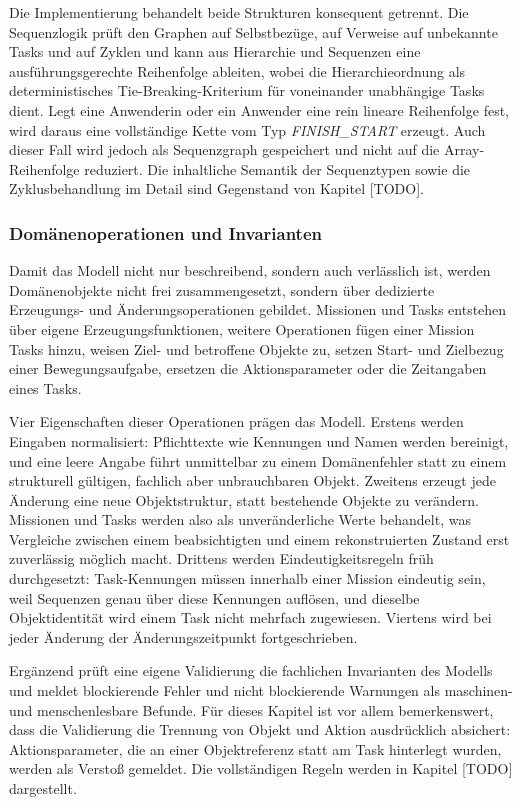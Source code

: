 Die Implementierung behandelt beide Strukturen konsequent getrennt. Die Sequenzlogik prüft den
Graphen auf Selbstbezüge, auf Verweise auf unbekannte Tasks und auf Zyklen und kann aus Hierarchie
und Sequenzen eine ausführungsgerechte Reihenfolge ableiten, wobei die Hierarchieordnung als
deterministisches Tie-Breaking-Kriterium für voneinander unabhängige Tasks dient. Legt eine
Anwenderin oder ein Anwender eine rein lineare Reihenfolge fest, wird daraus eine vollständige Kette
vom Typ \textit{FINISH\_START} erzeugt. Auch dieser Fall wird jedoch als Sequenzgraph gespeichert und nicht
auf die Array-Reihenfolge reduziert. Die inhaltliche Semantik der Sequenztypen sowie die
Zyklusbehandlung im Detail sind Gegenstand von Kapitel [TODO].

\subsubsection{Domänenoperationen und Invarianten}
Damit das Modell nicht nur beschreibend, sondern auch verlässlich ist, werden Domänenobjekte nicht
frei zusammengesetzt, sondern über dedizierte Erzeugungs- und Änderungsoperationen gebildet.
Missionen und Tasks entstehen über eigene Erzeugungsfunktionen, weitere Operationen fügen einer
Mission Tasks hinzu, weisen Ziel- und betroffene Objekte zu, setzen Start- und Zielbezug einer
Bewegungsaufgabe, ersetzen die Aktionsparameter oder die Zeitangaben eines Tasks.

Vier Eigenschaften dieser Operationen prägen das Modell. Erstens werden Eingaben normalisiert:
Pflichttexte wie Kennungen und Namen werden bereinigt, und eine leere Angabe führt unmittelbar zu
einem Domänenfehler statt zu einem strukturell gültigen, fachlich aber unbrauchbaren Objekt.
Zweitens erzeugt jede Änderung eine neue Objektstruktur, statt bestehende Objekte zu verändern.
Missionen und Tasks werden also als unveränderliche Werte behandelt, was Vergleiche zwischen einem
beabsichtigten und einem rekonstruierten Zustand erst zuverlässig möglich macht. Drittens werden
Eindeutigkeitsregeln früh durchgesetzt: Task-Kennungen müssen innerhalb einer Mission eindeutig
sein, weil Sequenzen genau über diese Kennungen auflösen, und dieselbe Objektidentität wird einem
Task nicht mehrfach zugewiesen. Viertens wird bei jeder Änderung der Änderungszeitpunkt
fortgeschrieben.

Ergänzend prüft eine eigene Validierung die fachlichen Invarianten des Modells und meldet
blockierende Fehler und nicht blockierende Warnungen als maschinen- und menschenlesbare Befunde. Für
dieses Kapitel ist vor allem bemerkenswert, dass die Validierung die Trennung von Objekt und Aktion
ausdrücklich absichert: Aktionsparameter, die an einer Objektreferenz statt am Task hinterlegt
wurden, werden als Verstoß gemeldet. Die vollständigen
Regeln werden in Kapitel [TODO] dargestellt.

